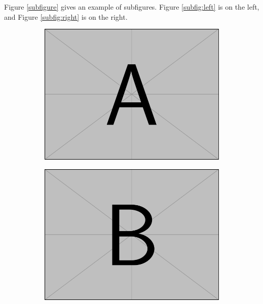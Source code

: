 \documentclass[12pt]{ctexart}
\begin{document}
Figure \ref{subfigure} gives an example of subfigures. Figure \ref{subfig:left} is on the left, and Figure \ref{subfig:right} is on the right.


\begin{figure}[!htbp]
	\centering
	\begin{subfigure}[t]{0.3\textwidth}
		\centering
		\includegraphics[width=\textwidth]{img/example-image-a.pdf}
		\caption*{}
		\label{}
	\end{subfigure}
	\begin{subfigure}[t]{0.3\textwidth}
		\centering
		\includegraphics[width=\textwidth]{img/example-image-b.pdf}
		\caption*{}
		\label{}
	\end{subfigure}

\end{figure}
\end{document}
